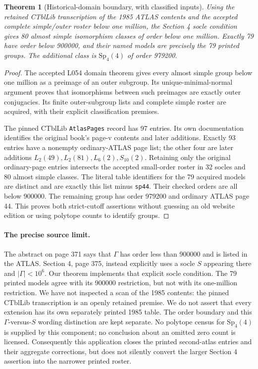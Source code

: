 \documentclass[10pt]{article}
\newtheorem{theorem}{Theorem}\newtheorem{lemma}{Lemma}
\begin{document}
\begin{theorem}[Historical-domain boundary, with classified inputs]
Using the retained CTblLib transcription of the 1985 ATLAS contents and
the accepted complete simple/outer roster below one million, the
Section 4 socle condition gives 80 almost simple isomorphism classes
of order below one million. Exactly 79 have order below 900000, and
their named models are precisely the 79 printed groups. The additional
class is $\mathrm{Sp}_4(4)$ of order 979200.
\end{theorem}
\begin{proof}
The accepted L054 domain theorem gives every almost simple group below
one million as a preimage of an outer subgroup. Its unique-minimal-normal
argument proves that isomorphisms between such preimages are exactly
outer conjugacies. Its finite outer-subgroup lists and complete simple
roster are acquired, with their explicit classification premises.

The pinned CTblLib \texttt{AtlasPages} record has 97 entries. Its own
documentation identifies the original book's page-v contents and later
additions. Exactly 93 entries have a nonempty ordinary-ATLAS page list;
the other four are later additions $L_2(49),L_2(81),L_6(2),S_{10}(2)$.
Retaining only the original ordinary-page entries intersects the accepted
small-order roster in 32 socles and 80 almost simple classes. The literal
table identifiers for the 79 acquired models are distinct and are
exactly this list minus \texttt{sp44}. Their checked orders are all
below 900000. The remaining group has order 979200 and ordinary ATLAS
page 44. This proves both strict-cutoff assertions without guessing an
old website edition or using polytope counts to identify groups.
\end{proof}

\paragraph{The precise source limit.}
The abstract on page 371 says that $\Gamma$ has order less than 900000
and is listed in the ATLAS. Section 4, page 375, instead explicitly
uses a socle $S$ appearing there and $|\Gamma|<10^6$. Our theorem
implements that explicit socle condition. The 79 printed models agree
with its 900000 restriction, but not with its one-million restriction.
We have not inspected a scan of the 1985 contents: the pinned CTblLib
transcription is an openly retained premise. We do not assert that every
extension has its own separately printed 1985 table. The order boundary
and this $\Gamma$-versus-$S$ wording distinction are kept separate.
No polytope census for $\mathrm{Sp}_4(4)$ is supplied by this component;
no conclusion about an omitted zero count is licensed. Consequently this
application closes the printed second-atlas entries and their aggregate
corrections, but does not silently convert the larger Section 4 assertion
into the narrower printed roster.
\end{document}
